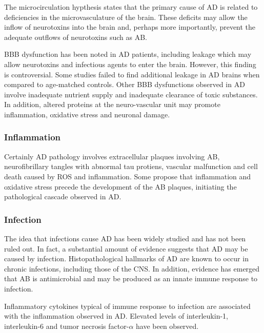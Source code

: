 \documentclass[twocolumn]{article}
\begin{document}
The microcirculation hypthesis states that the primary cause of
AD is related to deficiencies in the microvasculature of the brain.
These deficits may allow the inflow of neurotoxins into the brain
and, perhaps more importantly, prevent the adequate outflows of
neurotoxins such as AB.

BBB dysfunction has been noted in AD patients, including leakage which may allow
neurotoxins and infectious agents to enter the brain.
However, this finding is controversial.
Some studies failed to find additional leakage in AD brains
when compared to age-matched controls.
Other BBB dysfunctions observed in AD involve inadequate nutrient supply and
inadequate clearance of toxic substances.
In addition, altered proteins at the neuro-vascular unit may promote
inflammation, oxidative stress and neuronal damage.
\cite{erickson2013blood}


\subsubsection{Inflammation}

Certainly AD pathology involves extracellular plaques involving
AB, neurofibrillary tangles with abnormal tau protiens,
vascular malfunction
and cell death caused by ROS and inflammation.
Some propose that inflammation and oxidative stress precede
the development of the AB plaques, initiating the
pathological cascade observed in AD.
\cite{luque2014oxidative}




\subsubsection{Infection}

The idea that infections cause AD has been widely studied and
has not been ruled out. In fact,
a substantial amount of evidence suggests that
AD may be caused by infection.
Histopathological hallmarks of AD are known to occur in
chronic infections, including those of the CNS.
\cite{
iked1995numerous,
mandybur1990distribution,
kueh1984amyloid,
liberski1994transmissible,
kobayashi2008plaque,
sikorska2009ultrastructural,
de1984serum,
looi1988immunohistochemical,
rocken1999generalized,
wangel1982family,
tank2000renal,
urban1993ct}
In addition, evidence has emerged that AB is antimicrobial
and may be produced as an innate immune response to infection.
\cite{soscia2010alzheimer}


Inflammatory cytokines typical of immune response to infection
are associated with the inflammation observed in AD.
Elevated levels of interleukin-1, interleukin-6 and
tumor necrosis factor-$\alpha$ have been observed.
\cite{
sastre2006contribution,
holmes2011systemic,
akiyama2000inflammation,
cojocaru2011study}
\end{document}
